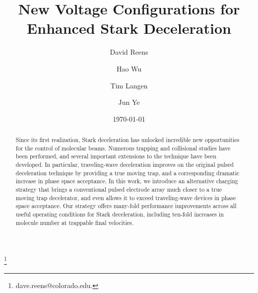 \documentclass[%
 reprint,
 amsmath,amssymb,
 aps,
prl,
]{revtex4-1}
\begin{document}
\title{New Voltage Configurations for Enhanced Stark Deceleration}%

\author{David Reens}
\thanks{dave.reens@colorado.edu.}

\author{Hao Wu}

\author{Tim Langen}%

\author{Jun Ye}


\date{\today}



\begin{abstract}
Since its first realization, Stark deceleration has unlocked incredible new opportunities for the control of molecular beams. 
Numerous trapping and collisional studies have been performed, and several important extensions to the technique have been developed. 
In particular, traveling-wave deceleration improves on the original pulsed deceleration technique by providing a true moving trap, and a corresponding dramatic increase in phase space acceptance.
In this work, we introduce an alternative charging strategy that brings a conventional pulsed electrode array much closer to a true moving trap decelerator, and even allows it to exceed traveling-wave devices in phase space acceptance.
Our strategy offers many-fold performance improvements across all useful operating conditions for Stark deceleration, including ten-fold increases in molecule number at trappable final velocities.
\end{abstract}

\maketitle
\end{document}
